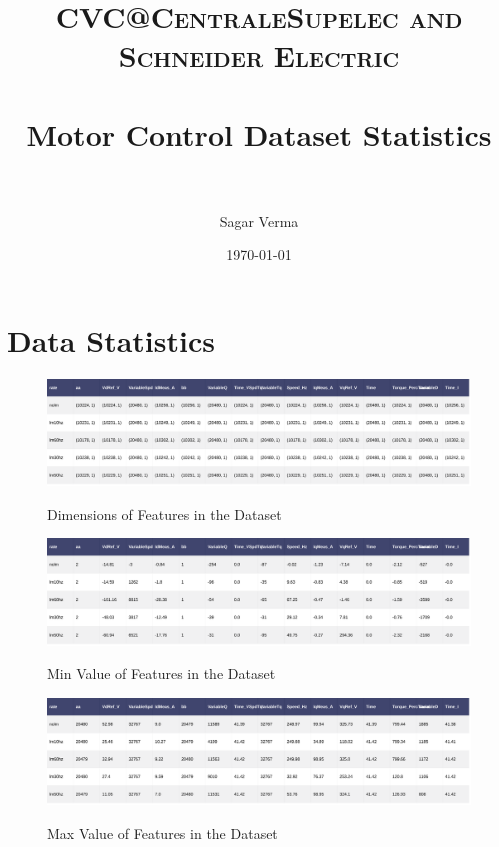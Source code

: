 \documentclass[paper=a4, fontsize=11pt]{scrartcl} %
\title{
\normalfont \normalsize
\textsc{CVC@CentraleSupelec and Schneider Electric} \\ [25pt] %
\horrule{0.5pt} \\[0.4cm] %
\huge Motor Control Dataset Statistics \\ %
\horrule{2pt} \\[0.5cm] %
}
\author{Sagar Verma} %
\date{\normalsize\today} %
\numberwithin{equation}{section} %
\numberwithin{figure}{section} %
\numberwithin{table}{section} %
\begin{document}
\maketitle %


\section{Data Statistics}

  \begin{figure}[H]
     \centering
      \href{https://plot.ly/~versag/20/#/}{\includegraphics[width=1\linewidth]{dimension_of_features_in_dataset}}
        \caption{Dimensions of Features in the Dataset}
  \end{figure}

  \begin{figure}[H]
    \centering
      \href{https://plot.ly/~versag/24/#/}{\includegraphics[width=1\linewidth]{min_values_of_features_in_dataset}}
        \caption{Min Value of Features in the Dataset}
  \end{figure}

  \begin{figure}[H]
    \centering
      \href{https://plot.ly/~versag/22/#/}{\includegraphics[width=1\linewidth]{max_values_of_features_in_dataset}}
        \caption{Max Value of Features in the Dataset}
  \end{figure}
\end{document}
